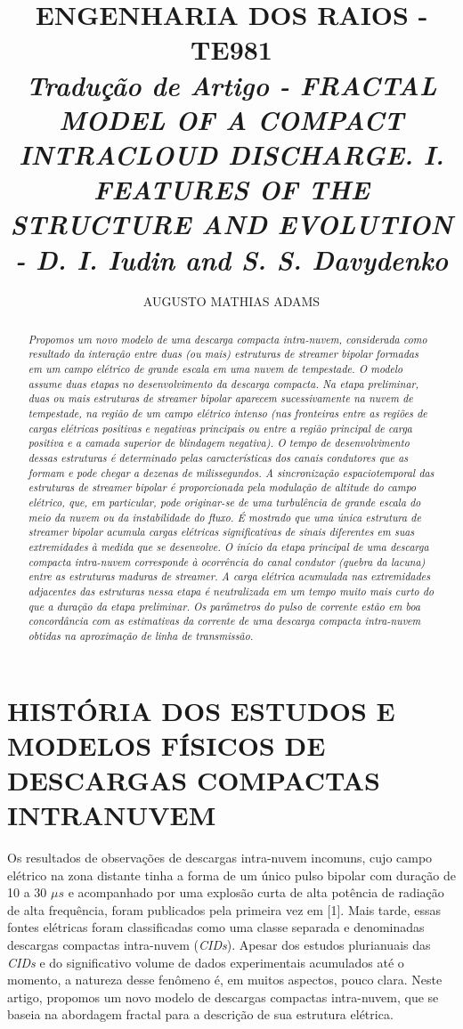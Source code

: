 \documentclass[a4paper, 12pt, onecolumn,singlespacing]{article}
\title{\normalsize{ENGENHARIA DOS RAIOS - TE981}\\ \huge{\textbf\textit{{Tradução de Artigo - FRACTAL MODEL OF A COMPACT INTRACLOUD DISCHARGE. I. FEATURES OF THE STRUCTURE AND EVOLUTION - D. I. Iudin and S. S. Davydenko}}\\}}
\author{\small{AUGUSTO MATHIAS ADAMS}}
\begin{document}
	
	\maketitle

	\begin{abstract}
		\textit{Propomos um novo modelo de uma descarga compacta intra-nuvem, considerada como resultado da interação entre duas (ou mais) estruturas de \textit{streamer} bipolar formadas em um campo elétrico de grande escala em uma nuvem de tempestade. O modelo assume duas etapas no desenvolvimento da descarga compacta. Na etapa preliminar, duas ou mais estruturas de \textit{streamer} bipolar aparecem sucessivamente na nuvem de tempestade, na região de um campo elétrico intenso (nas fronteiras entre as regiões de cargas elétricas positivas e negativas principais ou entre a região principal de carga positiva e a camada superior de blindagem negativa). O tempo de desenvolvimento dessas estruturas é determinado pelas características dos canais condutores que as formam e pode chegar a dezenas de milissegundos. A sincronização espaciotemporal das estruturas de \textit{streamer} bipolar é proporcionada pela modulação de altitude do campo elétrico, que, em particular, pode originar-se de uma turbulência de grande escala do meio da nuvem ou da instabilidade do fluxo. É mostrado que uma única estrutura de \textit{streamer} bipolar acumula cargas elétricas significativas de sinais diferentes em suas extremidades à medida que se desenvolve. O início da etapa principal de uma descarga compacta intra-nuvem corresponde à ocorrência do canal condutor (quebra da lacuna) entre as estruturas maduras de \textit{streamer}. A carga elétrica acumulada nas extremidades adjacentes das estruturas nessa etapa é neutralizada em um tempo muito mais curto do que a duração da etapa preliminar. Os parâmetros do pulso de corrente estão em boa concordância com as estimativas da corrente de uma descarga compacta intra-nuvem obtidas na aproximação de linha de transmissão.}
	\end{abstract}

	
	\section{HISTÓRIA DOS ESTUDOS E MODELOS FÍSICOS DE DESCARGAS COMPACTAS INTRANUVEM}
	
	Os resultados de observações de descargas intra-nuvem incomuns, cujo campo elétrico na zona distante tinha a forma de um único pulso bipolar com duração de 10 a 30 $\mu s$ e acompanhado por uma explosão curta de alta potência de radiação de alta frequência, foram publicados pela primeira vez em [1]. Mais tarde, essas fontes elétricas foram classificadas como uma classe separada e denominadas descargas compactas intra-nuvem (\textit{CIDs}). Apesar dos estudos plurianuais das \textit{CIDs} e do significativo volume de dados experimentais acumulados até o momento, a natureza desse fenômeno é, em muitos aspectos, pouco clara. Neste artigo, propomos um novo modelo de descargas compactas intra-nuvem, que se baseia na abordagem fractal para a descrição de sua estrutura elétrica.
	
\end{document}

